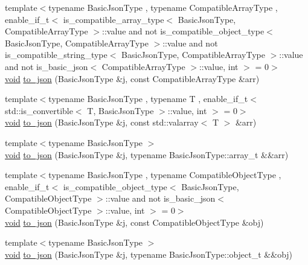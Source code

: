 \begin{DoxyCompactItemize}
{\footnotesize template$<$typename Basic\+Json\+Type , typename Compatible\+Array\+Type , enable\+\_\+if\+\_\+t$<$ is\+\_\+compatible\+\_\+array\+\_\+type$<$ Basic\+Json\+Type, Compatible\+Array\+Type $>$\+::value and not is\+\_\+compatible\+\_\+object\+\_\+type$<$ Basic\+Json\+Type, Compatible\+Array\+Type $>$\+::value and not is\+\_\+compatible\+\_\+string\+\_\+type$<$ Basic\+Json\+Type, Compatible\+Array\+Type $>$\+::value and not is\+\_\+basic\+\_\+json$<$ Compatible\+Array\+Type $>$\+::value, int $>$  = 0$>$ }\\\hyperlink{namespacenlohmann_1_1detail_a59fca69799f6b9e366710cb9043aa77d}{void} \hyperlink{namespacenlohmann_1_1detail_a3afebc132c5ff83f9cd160e52030fdfd}{to\+\_\+json} (Basic\+Json\+Type \&j, const Compatible\+Array\+Type \&arr)
\item 
{\footnotesize template$<$typename Basic\+Json\+Type , typename T , enable\+\_\+if\+\_\+t$<$ std\+::is\+\_\+convertible$<$ T, Basic\+Json\+Type $>$\+::value, int $>$  = 0$>$ }\\\hyperlink{namespacenlohmann_1_1detail_a59fca69799f6b9e366710cb9043aa77d}{void} \hyperlink{namespacenlohmann_1_1detail_a7f7c7b9760161b774cdc0b4b838fae64}{to\+\_\+json} (Basic\+Json\+Type \&j, const std\+::valarray$<$ T $>$ \&arr)
\item 
{\footnotesize template$<$typename Basic\+Json\+Type $>$ }\\\hyperlink{namespacenlohmann_1_1detail_a59fca69799f6b9e366710cb9043aa77d}{void} \hyperlink{namespacenlohmann_1_1detail_aa0fd1b5788e9ba37e31da43dda738cb5}{to\+\_\+json} (Basic\+Json\+Type \&j, typename Basic\+Json\+Type\+::array\+\_\+t \&\&arr)
\item 
{\footnotesize template$<$typename Basic\+Json\+Type , typename Compatible\+Object\+Type , enable\+\_\+if\+\_\+t$<$ is\+\_\+compatible\+\_\+object\+\_\+type$<$ Basic\+Json\+Type, Compatible\+Object\+Type $>$\+::value and not is\+\_\+basic\+\_\+json$<$ Compatible\+Object\+Type $>$\+::value, int $>$  = 0$>$ }\\\hyperlink{namespacenlohmann_1_1detail_a59fca69799f6b9e366710cb9043aa77d}{void} \hyperlink{namespacenlohmann_1_1detail_a24c9c12f3839c94e09532f08de85e949}{to\+\_\+json} (Basic\+Json\+Type \&j, const Compatible\+Object\+Type \&obj)
\item 
{\footnotesize template$<$typename Basic\+Json\+Type $>$ }\\\hyperlink{namespacenlohmann_1_1detail_a59fca69799f6b9e366710cb9043aa77d}{void} \hyperlink{namespacenlohmann_1_1detail_ac9f7a5542851c61d93740148eaec509f}{to\+\_\+json} (Basic\+Json\+Type \&j, typename Basic\+Json\+Type\+::object\+\_\+t \&\&obj)

\end{DoxyCompactItemize}
